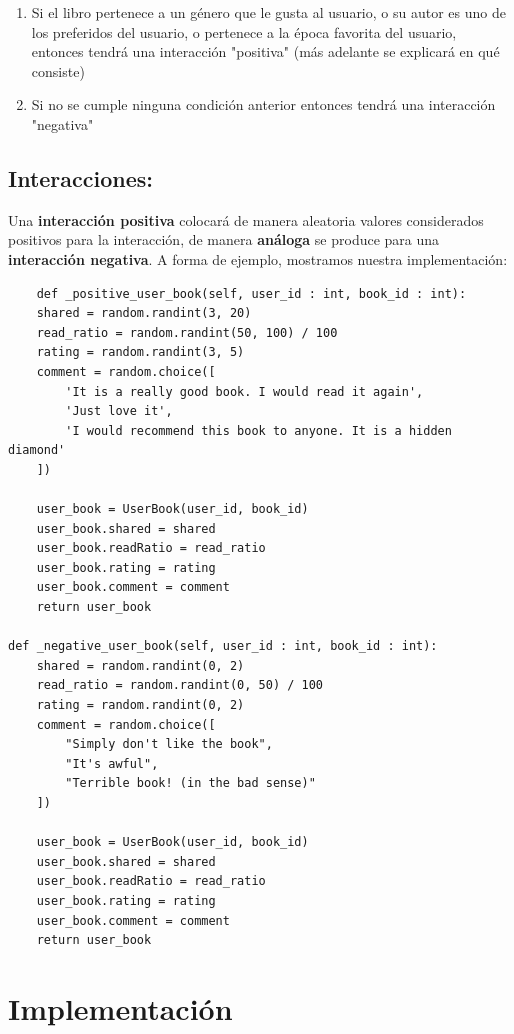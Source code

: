 \documentclass[14pt]{extarticle}
\begin{document}
\begin{enumerate}
    \item Si el libro pertenece a un género que le gusta al usuario, o su autor es uno de los preferidos del usuario, o pertenece a la época favorita del usuario, entonces tendrá una interacción "positiva" (más adelante se explicará en qué consiste)
    \item Si no se cumple ninguna condición anterior entonces tendrá una interacción "negativa"
\end{enumerate}

\subsection{Interacciones:}

Una \textbf{interacción positiva} colocará de manera aleatoria valores considerados positivos para la interacción, de manera \textbf{análoga} se produce para una \textbf{interacción negativa}. A forma de ejemplo, mostramos nuestra implementación:

\begin{verbatim}
    def _positive_user_book(self, user_id : int, book_id : int):
    shared = random.randint(3, 20)
    read_ratio = random.randint(50, 100) / 100
    rating = random.randint(3, 5)
    comment = random.choice([
        'It is a really good book. I would read it again',
        'Just love it',
        'I would recommend this book to anyone. It is a hidden diamond'
    ])

    user_book = UserBook(user_id, book_id)
    user_book.shared = shared
    user_book.readRatio = read_ratio
    user_book.rating = rating
    user_book.comment = comment
    return user_book

def _negative_user_book(self, user_id : int, book_id : int):
    shared = random.randint(0, 2)
    read_ratio = random.randint(0, 50) / 100
    rating = random.randint(0, 2)
    comment = random.choice([
        "Simply don't like the book",
        "It's awful",
        "Terrible book! (in the bad sense)"
    ])

    user_book = UserBook(user_id, book_id)
    user_book.shared = shared
    user_book.readRatio = read_ratio
    user_book.rating = rating
    user_book.comment = comment
    return user_book    
\end{verbatim}


\section{Implementación}
\end{document}
